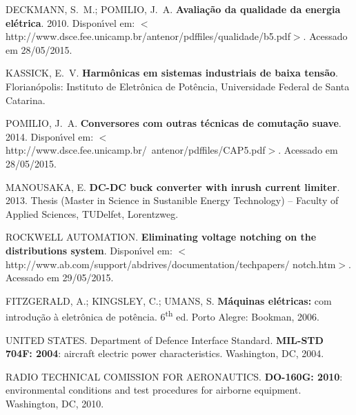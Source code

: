 \begin{thebibliography}{}
{DECKMANN, S.~M.; POMILIO, J.~A. \textbf{Avalia{\c{c}}{\~a}o da qualidade da
  energia el{\'e}trica}. 2010.
  Dispon{\'\i}vel em:
  $<$http://www.dsce.fee.unicamp.br/antenor/pdffiles/qualidade/b5.pdf$>$.
  Acessado em 28/05/2015.}


{KASSICK, E.~V. \textbf{Harm{\^o}nicas em sistemas industriais de baixa
  tens{\~a}o}.
Florian{\'o}polis: Instituto de Eletr\^onica de Pot\^encia,
  Universidade Federal de Santa Catarina.}

{POMILIO, J.~A. \textbf{Conversores com outras t{\'e}cnicas de
  comuta{\c{c}}{\~a}o suave}. 2014.
  Dispon{\'\i}vel em:
  $<$http://www.dsce.fee.unicamp.br/~antenor/pdffiles/CAP5.pdf$>$.}
  Acessado em 28/05/2015.


{MANOUSAKA, E.
\textbf{DC-DC buck converter with inrush current limiter}. 2013.
Thesis (Master in Science in Sustanible Energy Technology) -- Faculty of Applied Sciences, TUDelfet, Lorentzweg.}

{ROCKWELL AUTOMATION. \newblock \textbf{Eliminating voltage notching on the distributions
  system}.
  Dispon{\'\i}vel em:
  $<$http://www.ab.com/support/abdrives/documentation/techpapers/ notch.htm$>$.}
  Acessado em 29/05/2015.


{FITZGERALD, A.; KINGSLEY, C.; UMANS, S. \textbf{M{\'a}quinas el{\'e}tricas:} com
  introdu{\c{c}}{\~a}o {\`a} eletr{\^o}nica de pot{\^e}ncia. 6\textsuperscript{th} ed. Porto Alegre:
  Bookman, 2006.}

{UNITED STATES. Department of Defence Interface Standard. \textbf{MIL-STD 704F: 2004}: aircraft
	electric power characteristics. Washington, DC, 2004.}

{RADIO TECHNICAL COMISSION FOR AERONAUTICS. \textbf{DO-160G: 2010}: environmental conditions and test procedures for airborne equipment. Washington, DC, 2010.}


\end{thebibliography}
